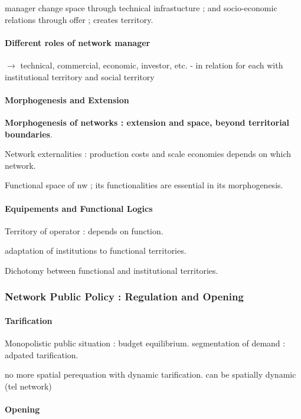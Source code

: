manager change space through technical infrastucture ; and socio-economic relations through offer ; creates territory.


\paragraph{Different roles of network manager}

$\rightarrow$ technical, commercial, economic, investor, etc. - in relation for each with institutional territory and social territory

\paragraph{Morphogenesis and Extension}

\textbf{Morphogenesis of networks : extension and space, beyond territorial boundaries}.

Network externalities : production costs and scale economies depends on which network.

Functional space of nw ; its functionalities are essential in its morphogenesis.

\paragraph{Equipements and Functional Logics}

Territory of operator : depends on function.

adaptation of institutions to functional territories.

Dichotomy between functional and institutional territories.

\subsubsection*{Network Public Policy : Regulation and Opening}

\paragraph{Tarification}

Monopolistic public situation : budget equilibrium. segmentation of demand : adpated tarification.

no more spatial perequation with dynamic tarification. can be spatially dynamic (tel network)

\paragraph{Opening}

